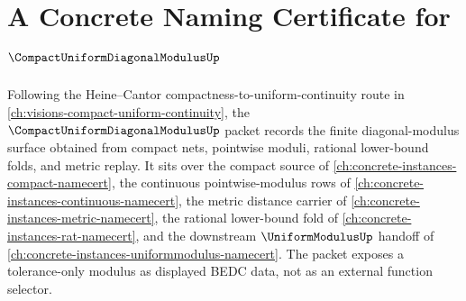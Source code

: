\chapter{A Concrete Naming Certificate for $\CompactUniformDiagonalModulusUp$}
\label{ch:concrete-instances-compact-uniform-diagonal-modulus-namecert}

Following the Heine--Cantor compactness-to-uniform-continuity route in \autoref{ch:visions-compact-uniform-continuity}, the $\CompactUniformDiagonalModulusUp$ packet records the finite diagonal-modulus surface obtained from compact nets, pointwise moduli, rational lower-bound folds, and metric replay. It sits over the compact source of \autoref{ch:concrete-instances-compact-namecert}, the continuous pointwise-modulus rows of \autoref{ch:concrete-instances-continuous-namecert}, the metric distance carrier of \autoref{ch:concrete-instances-metric-namecert}, the rational lower-bound fold of \autoref{ch:concrete-instances-rat-namecert}, and the downstream $\UniformModulusUp$ handoff of \autoref{ch:concrete-instances-uniformmodulus-namecert}. The packet exposes a tolerance-only modulus as displayed BEDC data, not as an external function selector.

